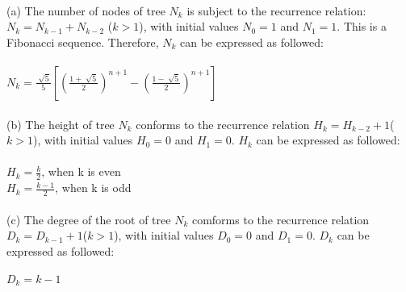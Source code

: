 \begin{problem}{1} ~\\
(a) The number of nodes of tree $N_k$ is subject to the recurrence relation: $N_k = N_{k-1} + N_{k-2}$
($k > 1$), with initial values $N_0 = 1$ and $N_1 = 1$. This is a Fibonacci sequence. Therefore, $N_k$ can be expressed as followed:\\
\\
\tab\tab\tab\tab\tab $N_k = \frac{\sqrt[]{5}}{5}[(\frac{1 + \sqrt[]{5}}{2})^{n+1} - (\frac{1 - \sqrt[]{5}}{2})^{n+1}]$\\
\\
(b) The height of tree $N_k$ conforms to the recurrence relation $H_k = H_{k-2} + 1$($k > 1$), with initial values $H_0 = 0$ and $H_1 = 0$. $H_k$ can be expressed as followed:\\
\\
\tab\tab\tab\tab\tab\tab $H_k = \frac{k}{2}$, when k is even\\
\tab\tab\tab\tab\tab\tab $H_k = \frac{k-1}{2}$, when k is odd\\
\\
(c) The degree of the root of tree $N_k$ comforms to the recurrence relation $D_k = D_{k-1} + 1$($k > 1$), with initial values $D_0 = 0$ and $D_1 = 0$. $D_k$ can be expressed as followed:\\
\\
\tab\tab\tab\tab\tab\tab\tab $D_k = k - 1$
\end{problem}